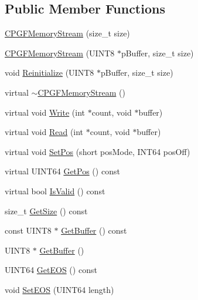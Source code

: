 \subsection*{Public Member Functions}
\begin{DoxyCompactItemize}
\item 
\mbox{\hyperlink{classCPGFMemoryStream_a04270a0cc3b62a272c11289931e91986}{C\+P\+G\+F\+Memory\+Stream}} (size\+\_\+t size)
\item 
\mbox{\hyperlink{classCPGFMemoryStream_a7b1d3b9977b016ebbb077a233b461bd5}{C\+P\+G\+F\+Memory\+Stream}} (U\+I\+N\+T8 $\ast$p\+Buffer, size\+\_\+t size)
\item 
void \mbox{\hyperlink{classCPGFMemoryStream_afb1145a071e4156a4343c6203ad18b0c}{Reinitialize}} (U\+I\+N\+T8 $\ast$p\+Buffer, size\+\_\+t size)
\item 
virtual \mbox{\hyperlink{classCPGFMemoryStream_ab562ed581dd1ed8364a41463b6da5006}{$\sim$\+C\+P\+G\+F\+Memory\+Stream}} ()
\item 
virtual void \mbox{\hyperlink{classCPGFMemoryStream_a627161d30d8d10fc306f50ea9c37f1a5}{Write}} (int $\ast$count, void $\ast$buffer)
\item 
virtual void \mbox{\hyperlink{classCPGFMemoryStream_a4cf0499309d901fcdcd9282a7351d24d}{Read}} (int $\ast$count, void $\ast$buffer)
\item 
virtual void \mbox{\hyperlink{classCPGFMemoryStream_a28e8defe72f535c49535c40ffe2ad299}{Set\+Pos}} (short pos\+Mode, I\+N\+T64 pos\+Off)
\item 
virtual U\+I\+N\+T64 \mbox{\hyperlink{classCPGFMemoryStream_a40556ef625e2bd49144281b3f6e1f0dd}{Get\+Pos}} () const
\item 
virtual bool \mbox{\hyperlink{classCPGFMemoryStream_a5eb1f2ee69815d63fa764b100d883655}{Is\+Valid}} () const
\item 
size\+\_\+t \mbox{\hyperlink{classCPGFMemoryStream_a44170277f36028bbff876fd6ebaeef21}{Get\+Size}} () const
\item 
const U\+I\+N\+T8 $\ast$ \mbox{\hyperlink{classCPGFMemoryStream_a4cfd2eca6ce408dbc37c018cbed20424}{Get\+Buffer}} () const
\item 
U\+I\+N\+T8 $\ast$ \mbox{\hyperlink{classCPGFMemoryStream_ae6c636725895a016902ea76aeb5d9301}{Get\+Buffer}} ()
\item 
U\+I\+N\+T64 \mbox{\hyperlink{classCPGFMemoryStream_adac05f8f6c35bb8b82cfeef431bc7171}{Get\+E\+OS}} () const
\item 
void \mbox{\hyperlink{classCPGFMemoryStream_a0e295b7061f07f840580d36f7946f523}{Set\+E\+OS}} (U\+I\+N\+T64 length)
\end{DoxyCompactItemize}
